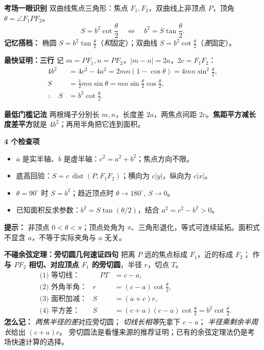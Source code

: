 \clearpage
\begin{summarybox}
\textbf{\textcolor{CSummary}{考场一眼识别}}
双曲线焦点三角形：焦点 $F_1,F_2$，双曲线上非顶点 $P$，顶角 $\theta=\angle F_1PF_2$。
\[
\boxed{\displaystyle S=b^2\cot\frac\theta2}
\quad\Longleftrightarrow\quad
\boxed{\displaystyle b^2=S\tan\frac\theta2}.
\]
\textbf{记忆搭档：} 椭圆 $S=b^2\tan\frac\theta2$（\emph{和}固定）；双曲线 $S=b^2\cot\frac\theta2$（\emph{差}固定）。

\medskip
\textbf{\textcolor{CSummary}{最快证明：三行}}
记 $m=PF_1,n=PF_2$，$|m-n|=2a$，$2c=F_1F_2$：
\[
\begin{aligned}
4b^2&=4c^2-4a^2=2mn(1-\cos\theta)
=4mn\sin^2\tfrac\theta2,\\
S&=\tfrac12 mn\sin\theta
=mn\sin\tfrac\theta2\cos\tfrac\theta2,\\
\therefore\quad S&=\boxed{b^2\cot\tfrac\theta2}.
\end{aligned}
\]

\textbf{\textcolor{CSummary}{最低门槛记法}}
两根绳子分别长 $m,n$，长度差 $2a$，两焦点间距 $2c$。\textbf{焦距平方减长度差平方}就是 $4b^2$；再用半角把它连到面积。

\medskip
\textbf{\textcolor{CSummary}{4 个检查项}}
\begin{itemize}[leftmargin=*,itemsep=0.25em,topsep=0.2em]
\item $a$ 是实半轴、$b$ 是虚半轴：$c^2=a^2+b^2$；焦点方向不限。
\item 底高回验：$S=c\,\operatorname{dist}(P,F_1F_2)$；横向为 $c|y|$，纵向为 $c|x|$。
\item $\theta=90^\circ$ 时 $S=b^2$；趋近顶点时 $\theta\to180^\circ,\ S\to0$。
\item 已知面积反求参数：$b^2=S\tan(\theta/2)$，结合 $a^2=c^2-b^2>0$。
\end{itemize}
\textbf{\textcolor{CSummary}{提示：}} 非顶点 $0<\theta<\pi$；顶点处角为 $\pi$、三角形退化，等式可连续延拓。面积式不显含 $a$，不等于实际夹角与 $a$ 无关。
\end{summarybox}

\clearpage
\begin{summarybox}
\textbf{\textcolor{CSummary}{不碰余弦定理：旁切圆几何速证四句}}
把离 $P$ 远的焦点标成 $F_1$，近的标成 $F_2$；
作\textbf{与 $PF_2$ 相切、对应顶点 $F_1$ 的旁切圆}，半径 $r$，切点 $T$。
\[
\begin{aligned}
 &\text{(1) 等切线：}&\quad PT&=c-a,\\
 &\text{(2) 外角半角：}&r&=(c-a)\cot\frac\theta2,\\
 &\text{(3) 面积加减：}&S&=(a+c)r,\\
 &\text{(4) 平方差：}&S&=(c+a)(c-a)\cot\frac\theta2
                           =\boxed{b^2\cot\frac\theta2}.
\end{aligned}
\]
\textbf{怎么记：} \emph{两焦半径的差}对应旁切圆；
\emph{切线长相等}先拿下 $c-a$；
\emph{半径乘剩余半周长}给出 $(c+a)r$。
旁切圆法是看懂来源的推荐证明；已有的余弦定理法仍是考场快速计算的选择。
\end{summarybox}
